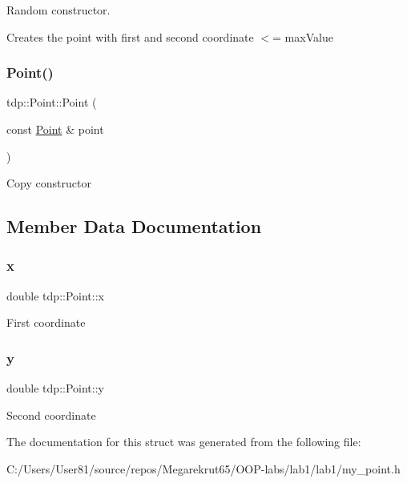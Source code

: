 Random constructor. 

Creates the point with first and second coordinate $<$= \textquotesingle{}max\+Value\textquotesingle{} \mbox{\label{structtdp_1_1_point_af13c65c1b6d9a0cd1d5360eb29c8e1ce}} 
\subsubsection{\texorpdfstring{Point()}{Point()}\hspace{0.1cm}{\footnotesize\ttfamily [4/4]}}
{\footnotesize\ttfamily tdp\+::\+Point\+::\+Point (\begin{DoxyParamCaption}\item[{const \mbox{\hyperlink{structtdp_1_1_point}{Point}} \&}]{point }\end{DoxyParamCaption})}

Copy constructor 

\subsection{Member Data Documentation}
\mbox{\label{structtdp_1_1_point_a31898184708346947177896af4c7eac6}} 
\subsubsection{\texorpdfstring{x}{x}}
{\footnotesize\ttfamily double tdp\+::\+Point\+::x}

First coordinate \mbox{\label{structtdp_1_1_point_af46e9a346f374660a675336c2e619a69}} 
\subsubsection{\texorpdfstring{y}{y}}
{\footnotesize\ttfamily double tdp\+::\+Point\+::y}

Second coordinate 

The documentation for this struct was generated from the following file\+:\begin{DoxyCompactItemize}
\item 
C\+:/\+Users/\+User81/source/repos/\+Megarekrut65/\+O\+O\+P-\/labs/lab1/lab1/my\+\_\+point.\+h\end{DoxyCompactItemize}
